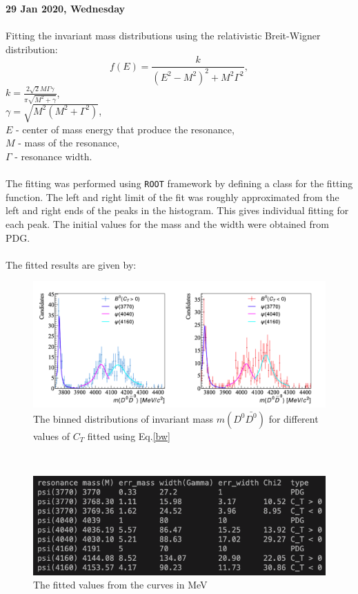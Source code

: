 \noindent\textbf{29 Jan 2020, Wednesday}
\\
\\
Fitting the invariant mass distributions using the relativistic Breit-Wigner distribution\autocite{wiki:xxxx}:
\begin{equation}
    f(E) = \frac{k}{(E^2-M^2)^2 + M^2\Gamma^2},
    \label{bw}
\end{equation}
\indent $k = \frac{2\sqrt{2}M\Gamma\gamma}{\pi\sqrt{M^2+\gamma}}$,
\\
\indent $\gamma = \sqrt{M^2(M^2+\Gamma^2)}$,
\\
\indent $E$ - center of mass energy that produce the resonance,
\\
\indent $M$ - mass of the resonance,
\\
\indent $\Gamma$ - resonance width.
\\
\\
The fitting was performed using \texttt{ROOT} framework by defining a class for the fitting function. The left and right limit of the fit was roughly approximated from the left and right ends of the peaks in the histogram. This gives individual fitting for each peak. The initial values for the mass and the width were obtained from PDG.
\\
\\
The fitted results are given by:
\begin{figure}[h]
\center
\includegraphics*[width=0.86\linewidth]{CM_variables_B0/invmass_D0Dbar0_fit}
\caption{The binned distributions of invariant mass $m(D^0\bar{D^0})$ for different values of $C_T$ fitted using Eq.\ref{bw}}
\label{DD_fit}
\end{figure}
\\
\begin{figure}[h]
\center
\includegraphics*[width=0.86\linewidth]{CM_variables_B0/invmassdd_fitdata}
\caption{The fitted values from the curves in MeV}
\label{DD_fitdata}
\end{figure}

